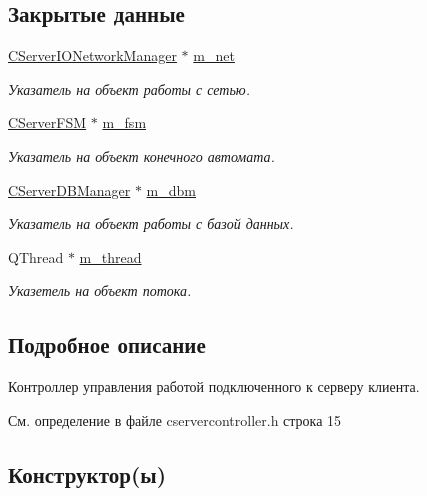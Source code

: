 \subsection*{Закрытые данные}
\begin{DoxyCompactItemize}
\item 
\hyperlink{class_c_server_i_o_network_manager}{C\+Server\+I\+O\+Network\+Manager} $\ast$ \hyperlink{class_c_server_controller_a64ce9925628d153d9576ee4534380dac}{m\+\_\+net}
\begin{DoxyCompactList}\small\item\em Указатель на объект работы с сетью. \end{DoxyCompactList}\item 
\hyperlink{class_c_server_f_s_m}{C\+Server\+F\+SM} $\ast$ \hyperlink{class_c_server_controller_a3282dabaabac03bdb3447001c186a97f}{m\+\_\+fsm}
\begin{DoxyCompactList}\small\item\em Указатель на объект конечного автомата. \end{DoxyCompactList}\item 
\hyperlink{class_c_server_d_b_manager}{C\+Server\+D\+B\+Manager} $\ast$ \hyperlink{class_c_server_controller_ab147bebeb63fe45d845090f0a4750582}{m\+\_\+dbm}
\begin{DoxyCompactList}\small\item\em Указатель на объект работы с базой данных. \end{DoxyCompactList}\item 
Q\+Thread $\ast$ \hyperlink{class_c_server_controller_a4a4764db869209e68283af91608f9751}{m\+\_\+thread}
\begin{DoxyCompactList}\small\item\em Указетель на объект потока. \end{DoxyCompactList}\end{DoxyCompactItemize}


\subsection{Подробное описание}
Контроллер управления работой подключенного к серверу клиента. 

См. определение в файле cservercontroller.\+h строка 15



\subsection{Конструктор(ы)}
\hypertarget{class_c_server_controller_ac7fa78891be114aa9ae1985541d5a766}{}\label{class_c_server_controller_ac7fa78891be114aa9ae1985541d5a766} 
